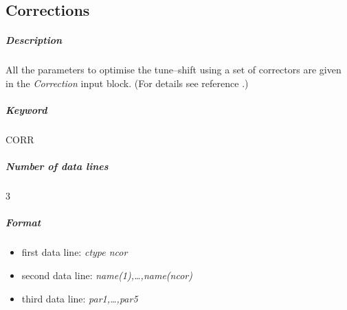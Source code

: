 \subsection{Corrections} \label{Corrections}

\subparagraph{Description} All the parameters to optimise the
tune--shift using a set of correctors are given in the {\em Correction
  } \/input block. (For details see reference \cite{Massimo}.)

\subparagraph{Keyword} CORR \subparagraph{Number of data lines} 3

\subparagraph{Format}
\begin{itemize}
\item first data line: {\em ctype ncor}
\item second data line: {\em name(1),\ldots,name(ncor)}
\item third data line: {\em par1,\ldots,par5}
\end{itemize}

